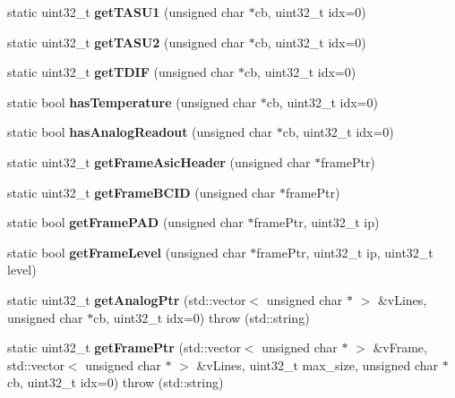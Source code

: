 \begin{DoxyCompactItemize}
\item 
static uint32\-\_\-t {\bfseries get\-T\-A\-S\-U1} (unsigned char $\ast$cb, uint32\-\_\-t idx=0)\label{classDIFUnpacker_a53856c28021d5fb4e6456971f982eb18}

\item 
static uint32\-\_\-t {\bfseries get\-T\-A\-S\-U2} (unsigned char $\ast$cb, uint32\-\_\-t idx=0)\label{classDIFUnpacker_ae0637a6a2f2f125e32fa61bc01bd17f2}

\item 
static uint32\-\_\-t {\bfseries get\-T\-D\-I\-F} (unsigned char $\ast$cb, uint32\-\_\-t idx=0)\label{classDIFUnpacker_a6d9a18d21dafac9dacc738d623b7e882}

\item 
static bool {\bfseries has\-Temperature} (unsigned char $\ast$cb, uint32\-\_\-t idx=0)\label{classDIFUnpacker_a0a70ac9ebc523e4289088967f2e518c5}

\item 
static bool {\bfseries has\-Analog\-Readout} (unsigned char $\ast$cb, uint32\-\_\-t idx=0)\label{classDIFUnpacker_aa02d8c21418823e1fa9fe0364e21a13d}

\item 
static uint32\-\_\-t {\bfseries get\-Frame\-Asic\-Header} (unsigned char $\ast$frame\-Ptr)\label{classDIFUnpacker_ae9004570d90ff565d8b18aa96222d4bc}

\item 
static uint32\-\_\-t {\bfseries get\-Frame\-B\-C\-I\-D} (unsigned char $\ast$frame\-Ptr)\label{classDIFUnpacker_a2ac77487a6292a01969859e8546f63de}

\item 
static bool {\bfseries get\-Frame\-P\-A\-D} (unsigned char $\ast$frame\-Ptr, uint32\-\_\-t ip)\label{classDIFUnpacker_a7dcd946045bfd90eacc02febd81237f1}

\item 
static bool {\bfseries get\-Frame\-Level} (unsigned char $\ast$frame\-Ptr, uint32\-\_\-t ip, uint32\-\_\-t level)\label{classDIFUnpacker_ae9dd6ecdd0a26d8c0b3dfe5407733d0a}

\item 
static uint32\-\_\-t {\bfseries get\-Analog\-Ptr} (std\-::vector$<$ unsigned char $\ast$ $>$ \&v\-Lines, unsigned char $\ast$cb, uint32\-\_\-t idx=0)  throw (std\-::string)\label{classDIFUnpacker_a17e12f0a800b6b9b1fa39f5ecf83d7c5}

\item 
static uint32\-\_\-t {\bfseries get\-Frame\-Ptr} (std\-::vector$<$ unsigned char $\ast$ $>$ \&v\-Frame, std\-::vector$<$ unsigned char $\ast$ $>$ \&v\-Lines, uint32\-\_\-t max\-\_\-size, unsigned char $\ast$cb, uint32\-\_\-t idx=0)  throw (std\-::string)\label{classDIFUnpacker_a5ab111b5d6acdeefd29648199800f27e}


\end{DoxyCompactItemize}
